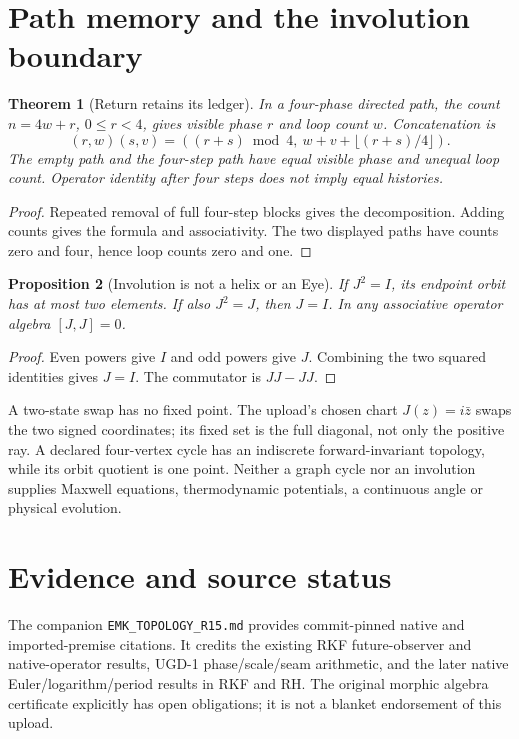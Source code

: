 \documentclass[11pt]{article}
\newtheorem{theorem}{Theorem}
\newtheorem{proposition}[theorem]{Proposition}
\begin{document}
\section{Path memory and the involution boundary}
\begin{theorem}[Return retains its ledger]
In a four-phase directed path, the count $n=4w+r$, $0\le r<4$, gives
visible phase $r$ and loop count $w$. Concatenation is
\[
(r,w)(s,v)=((r+s)\bmod4,\ w+v+\lfloor(r+s)/4\rfloor).
\]
The empty path and the four-step path have equal visible phase and unequal
loop count. Operator identity after four steps does not imply equal histories.
\end{theorem}
\begin{proof}
Repeated removal of full four-step blocks gives the decomposition.
Adding counts gives the formula and associativity. The two displayed paths
have counts zero and four, hence loop counts zero and one.
\end{proof}
\begin{proposition}[Involution is not a helix or an Eye]
If $J^2=I$, its endpoint orbit has at most two elements. If also $J^2=J$,
then $J=I$. In any associative operator algebra $[J,J]=0$.
\end{proposition}
\begin{proof}
Even powers give $I$ and odd powers give $J$. Combining the two squared
identities gives $J=I$. The commutator is $JJ-JJ$.
\end{proof}
A two-state swap has no fixed point. The upload's chosen chart
$J(z)=i\bar z$ swaps the two signed coordinates; its fixed set is the full
diagonal, not only the positive ray. A declared four-vertex cycle has an
indiscrete forward-invariant topology, while its orbit quotient is one point.
Neither a graph cycle nor an involution supplies Maxwell equations,
thermodynamic potentials, a continuous angle or physical evolution.

\section{Evidence and source status}
The companion \texttt{EMK\_TOPOLOGY\_R15.md} provides commit-pinned native
and imported-premise citations. It credits the existing RKF future-observer
and native-operator results, UGD-1 phase/scale/seam arithmetic, and the later
native Euler/logarithm/period results in RKF and RH. The original morphic
algebra certificate explicitly has open obligations; it is not a blanket
endorsement of this upload.
\end{document}
